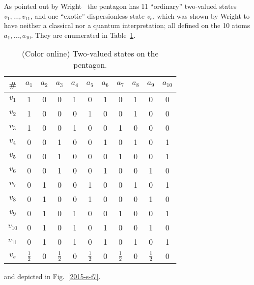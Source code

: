 \documentclass[%
  twocolumn,
 showpacs,
 showkeys,
 preprintnumbers,
 amsmath,amssymb,
 aps,
  pra,
  longbibliography,
 floatfix,
 ]{revtex4-1}
\begin{document}
\begin{figure}
{%
%
}
\end{figure}


As pointed out by Wright~\cite[p~268]{wright:pent} the pentagon has 11 ``ordinary'' two-valued states $v_1,\ldots ,v_{11}$,
and one ``exotic'' dispersionless state $v_e$,
which was shown by Wright to have neither a classical nor a quantum interpretation;
all defined on the 10 atoms $a_1, \ldots , a_{10}$.
They are enumerated in Table~\ref{2017-b-t-sotp}.
 \begin{table}%
 \begin{center}
 \caption{\label{2017-b-t-sotp} (Color online) Two-valued states on the pentagon.}
 \begin{ruledtabular}
 \begin{tabular}{ccccccccccc}
\#
&
$a_1$&
$a_2$&
$a_3$&
$a_4$&
$a_5$&
$a_6$&
$a_7$&
$a_8$&
$a_9$&
$a_{10}$
\\
\hline
$v_1$&1&  0&  0& 1&  0& 1&  0& 1&  0&  0 \\
$v_2$&1&  0&  0&  0& 1&  0&  0& 1&  0&  0\\
$v_3$&1&  0&  0& 1&  0&  0& 1&  0&  0&  0\\
$v_4$&0&  0& 1&  0&  0& 1&  0& 1&  0& 1\\
$v_5$&0&  0& 1&  0&  0&  0& 1&  0&  0& 1\\
$v_6$&0&  0& 1&  0&  0& 1&  0&  0& 1&  0\\
$v_7$&0& 1&  0&  0& 1&  0&  0& 1&  0& 1\\
$v_8$&0& 1&  0&  0& 1&  0&  0&  0& 1&  0\\
$v_9$&0& 1&  0& 1&  0&  0& 1&  0&  0& 1\\
$v_{10}$&0& 1&  0& 1&  0& 1&  0&  0& 1&  0\\
$v_{11}$&0& 1&  0& 1&  0& 1&  0& 1&  0& 1 \\
\hline
$v_e$&$\frac{1}{2}$& 0&  $\frac{1}{2}$& 0&  $\frac{1}{2}$& 0&  $\frac{1}{2}$& 0&  $\frac{1}{2}$& 0
 \end{tabular}
 \end{ruledtabular}
 \end{center}
 \end{table}
and depicted in Fig.~\ref{2015-s-f7}.
\end{document}
